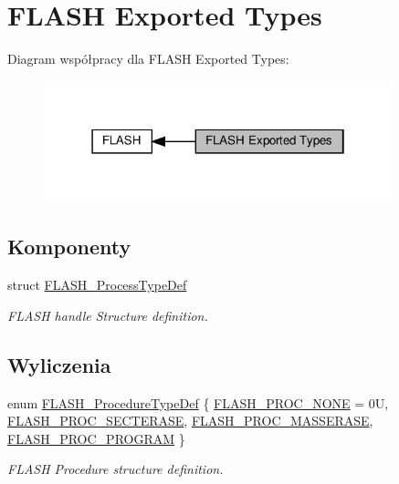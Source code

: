 \hypertarget{group___f_l_a_s_h___exported___types}{}\section{F\+L\+A\+SH Exported Types}
\label{group___f_l_a_s_h___exported___types}
Diagram współpracy dla F\+L\+A\+SH Exported Types\+:\nopagebreak
\begin{figure}[H]
\begin{center}
\leavevmode
\includegraphics[width=286pt]{group___f_l_a_s_h___exported___types}
\end{center}
\end{figure}
\subsection*{Komponenty}
\begin{DoxyCompactItemize}
\item 
struct \hyperlink{struct_f_l_a_s_h___process_type_def}{F\+L\+A\+S\+H\+\_\+\+Process\+Type\+Def}
\begin{DoxyCompactList}\small\item\em F\+L\+A\+SH handle Structure definition. \end{DoxyCompactList}\end{DoxyCompactItemize}
\subsection*{Wyliczenia}
\begin{DoxyCompactItemize}
\item 
enum \hyperlink{group___f_l_a_s_h___exported___types_ga2b0268387bc11bcab76be9ce7c43eaaf}{F\+L\+A\+S\+H\+\_\+\+Procedure\+Type\+Def} \{ \hyperlink{group___f_l_a_s_h___exported___types_gga2b0268387bc11bcab76be9ce7c43eaafa8d1dcf61f621d71484d13ac02f651b3d}{F\+L\+A\+S\+H\+\_\+\+P\+R\+O\+C\+\_\+\+N\+O\+NE} = 0U, 
\hyperlink{group___f_l_a_s_h___exported___types_gga2b0268387bc11bcab76be9ce7c43eaafade0899d9d9503dc5c8d926071bffee44}{F\+L\+A\+S\+H\+\_\+\+P\+R\+O\+C\+\_\+\+S\+E\+C\+T\+E\+R\+A\+SE}, 
\hyperlink{group___f_l_a_s_h___exported___types_gga2b0268387bc11bcab76be9ce7c43eaafa1b046d01356b498d6675040f17362f0b}{F\+L\+A\+S\+H\+\_\+\+P\+R\+O\+C\+\_\+\+M\+A\+S\+S\+E\+R\+A\+SE}, 
\hyperlink{group___f_l_a_s_h___exported___types_gga2b0268387bc11bcab76be9ce7c43eaafad4f5d611b11f7ac9577d34df07dc94ea}{F\+L\+A\+S\+H\+\_\+\+P\+R\+O\+C\+\_\+\+P\+R\+O\+G\+R\+AM}
 \}\begin{DoxyCompactList}\small\item\em F\+L\+A\+SH Procedure structure definition. \end{DoxyCompactList}
\end{DoxyCompactItemize}


